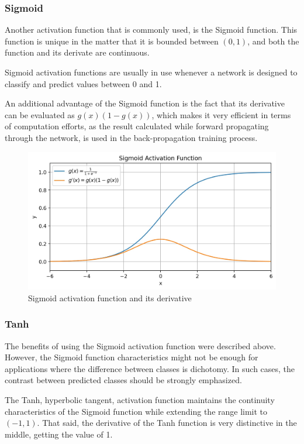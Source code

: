 \subsubsection{Sigmoid}
Another activation function that is commonly used,
is the Sigmoid function. This function is unique
in the matter that it is bounded between \((0, 1)\),
and both the function and its derivate are continuous.

Sigmoid activation functions are usually in use whenever
a network is designed to classify and predict
values between 0 and 1.

An additional advantage of the Sigmoid function is the
fact that its derivative can be
evaluated as \(g(x)(1-g(x))\), which makes it very
efficient in terms of computation efforts, as the result calculated
while forward propagating through the network, is
used in the back-propagation training process.
\begin{figure}[H]
    \centering
    \includegraphics[width=0.75\linewidth]{ANN/images/sigmoid}
    \caption{Sigmoid activation function and its derivative}\label{fig:sigmoid_af}
\end{figure}

\subsubsection{Tanh}
The benefits of using the Sigmoid activation function
were described above.
However, the Sigmoid function characteristics might not
be enough for applications where the difference
between classes is dichotomy. In such cases,
the contrast between predicted classes should be
strongly emphasized.

The Tanh, hyperbolic tangent, activation function
maintains the continuity characteristics of the
Sigmoid function while extending the range limit to
\((-1, 1)\). That said, the derivative of the Tanh
function is very distinctive in the middle, getting
the value of 1.

